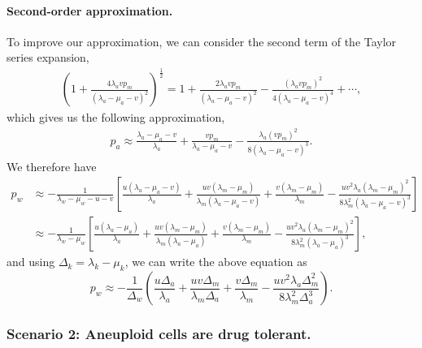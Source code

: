 \documentclass[12pt]{extarticle}
\begin{document}
\paragraph{Second-order approximation.}
To improve our approximation, we can consider the second term of the Taylor series expansion,
\begin{align*}
\left(1+\frac{4\lambda_avp_m}{\left(\lambda_a-\mu_a-v\right)^2}\right)^{\frac{1}{2}}=1+\frac{2\lambda_avp_m}{\left(\lambda_a-\mu_a-v\right)^2}-\frac{\left(\lambda_avp_m\right)^2}{4\left(\lambda_a-\mu_a-v\right)^4}+\cdots,
\end{align*}
which gives us the following approximation,
\begin{align}
p_a \approx \frac{\lambda_a-\mu_a-v}{\lambda_a}+\frac{vp_m}{\lambda_a-\mu_a-v}-\frac{\lambda_a\left(vp_m\right)^2}{8\left(\lambda_a-\mu_a-v\right)^3} .
\end{align}
We therefore have
\begin{align}\nonumber
p_w&\approx-\frac{1}{\lambda_w-\mu_w-u-v}\left[\frac{u\left(\lambda_a-\mu_a-v\right)}{\lambda_a}+\frac{uv\left(\lambda_m-\mu_m\right)}{\lambda_m\left(\lambda_a-\mu_a-v\right)}+\frac{v\left(\lambda_m-\mu_m\right)}{\lambda_m}-\frac{uv^2\lambda_a\left(\lambda_m-\mu_m\right)^2}{8\lambda_m^2\left(\lambda_a-\mu_a-v\right)^3}\right]\\ \label{survprobw3}
&\approx-\frac{1}{\lambda_w-\mu_w}\left[\frac{u\left(\lambda_a-\mu_a\right)}{\lambda_a}+\frac{uv\left(\lambda_m-\mu_m\right)}{\lambda_m\left(\lambda_a-\mu_a\right)}+\frac{v\left(\lambda_m-\mu_m\right)}{\lambda_m}-\frac{uv^2\lambda_a\left(\lambda_m-\mu_m\right)^2}{8\lambda_m^2\left(\lambda_a-\mu_a\right)^3}\right], 
\end{align}
and using $\Delta_k=\lambda_k-\mu_k$, we can write the above equation as
\begin{equation}\label{survprobwapproxcorrected}
p_w \approx -\frac{1}{\Delta_w}\left(\frac{u\Delta_a}{\lambda_a}+\frac{uv\Delta_m}{\lambda_m\Delta_a}+\frac{v\Delta_m}{\lambda_m}-\frac{uv^2\lambda_a\Delta_m^2}{8\lambda_m^2\Delta_a^3}\right).
\end{equation}


\subsubsection*{Scenario 2: Aneuploid cells are drug tolerant.} 
\end{document}
